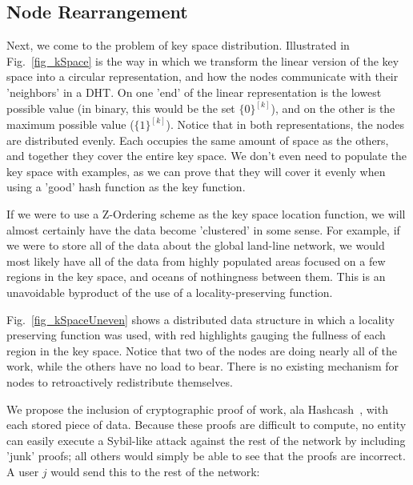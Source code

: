 \documentclass[10pt]{IEEEtran}
\begin{document}
\subsection{Node Rearrangement}
\par Next, we come to the problem of key space distribution. Illustrated in Fig.~\ref{fig_kSpace} is the way in which we transform the linear version of the key space into a circular representation, and how the nodes communicate with their 'neighbors' in a DHT. On one 'end' of the linear representation is the lowest possible value (in binary, this would be the set $\{0\}^{[k]}$), and on the other is the maximum possible value ($\{1\}^{[k]}$). Notice that in both representations, the nodes are distributed evenly. Each occupies the same amount of space as the others, and together they cover the entire key space. We don't even need to populate the key space with examples, as we can prove that they will cover it evenly when using a 'good' hash function as the key function.

\par If we were to use a Z-Ordering scheme as the key space location function, we will almost certainly have the data become 'clustered' in some sense. For example, if we were to store all of the data about the global land-line network, we would most likely have all of the data from highly populated areas focused on a few regions in the key space, and oceans of nothingness between them. This is an unavoidable byproduct of the use of a locality-preserving function.



\par Fig.~\ref{fig_kSpaceUneven} shows a distributed data structure in which a locality preserving function was used, with red highlights gauging the fullness of each region in the key space. Notice that two of the nodes are doing nearly all of the work, while the others have no load to bear. There is no existing mechanism for nodes to retroactively redistribute themselves.


\par We propose the inclusion of cryptographic proof of work, ala Hashcash~\cite{Back:2002vq}, with each stored piece of data. Because these proofs are difficult to compute, no entity can easily execute a Sybil-like attack against the rest of the network by including 'junk' proofs; all others would simply be able to see that the proofs are incorrect. A user $j$ would send this to the rest of the network:
\end{document}
